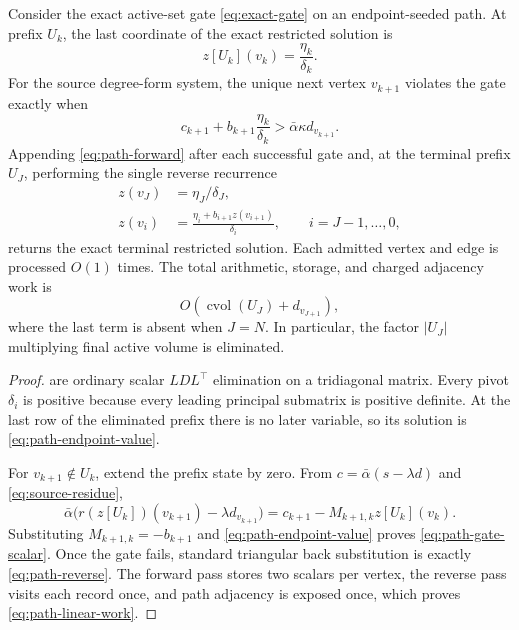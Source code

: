 \documentclass[11pt]{article}
\begin{document}
\begin{theorem}
\label{thm:path-linear}
Consider the exact active-set gate \cref{eq:exact-gate} on an endpoint-seeded
path.  At prefix $U_k$, the last coordinate of the exact restricted solution
is
\begin{equation}
 z[U_k](v_k)=\frac{\eta_k}{\delta_k}.
 \label{eq:path-endpoint-value}
\end{equation}
For the source degree-form system, the unique next vertex $v_{k+1}$ violates
the gate exactly when
\begin{equation}
 c_{k+1}+b_{k+1}\frac{\eta_k}{\delta_k}
 >\bar\alpha\kappa d_{v_{k+1}}.
 \label{eq:path-gate-scalar}
\end{equation}
Appending \cref{eq:path-forward} after each successful gate and, at the
terminal prefix $U_J$, performing the single reverse recurrence
\begin{align}
 z(v_J)&=\eta_J/\delta_J,
 \nonumber\\
 z(v_i)&=\frac{\eta_i+b_{i+1}z(v_{i+1})}{\delta_i},
 \qquad i=J-1,\ldots,0,
 \label{eq:path-reverse}
\end{align}
returns the exact terminal restricted solution.  Each admitted vertex and
edge is processed $O(1)$ times.  The total arithmetic, storage, and charged
adjacency work is
\begin{equation}
 O(\operatorname{cvol}(U_J)+d_{v_{J+1}}),
 \label{eq:path-linear-work}
\end{equation}
where the last term is absent when $J=N$.  In particular, the factor
$|U_J|$ multiplying final active volume is eliminated.
\end{theorem}

\begin{proof}
 are ordinary scalar
$LDL^\top$ elimination on a tridiagonal matrix.  Every pivot $\delta_i$ is
positive because every leading principal submatrix is positive definite.
At the last row of the eliminated prefix there is no later variable, so its
solution is \cref{eq:path-endpoint-value}.

For $v_{k+1}\notin U_k$, extend the prefix state by zero.  From
$c=\bar\alpha(s-\lambda d)$ and \cref{eq:source-residue},
\begin{equation}
 \bar\alpha\bigl(r(z[U_k])(v_{k+1})-\lambda d_{v_{k+1}}\bigr)
 =c_{k+1}-M_{k+1,k}z[U_k](v_k).
\end{equation}
Substituting $M_{k+1,k}=-b_{k+1}$ and
\cref{eq:path-endpoint-value} proves \cref{eq:path-gate-scalar}.  Once the
gate fails, standard triangular back substitution is exactly
\cref{eq:path-reverse}.  The forward pass stores two scalars per vertex, the
reverse pass visits each record once, and path adjacency is exposed once,
which proves \cref{eq:path-linear-work}.
\end{proof}
\end{document}
